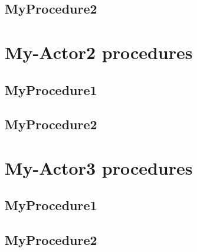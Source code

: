 


\subsection{MyProcedure2}




\section{My-Actor2 procedures}
\subsection{MyProcedure1}
\subsection{MyProcedure2}


\section{My-Actor3 procedures}

\subsection{MyProcedure1}
\subsection{MyProcedure2}















